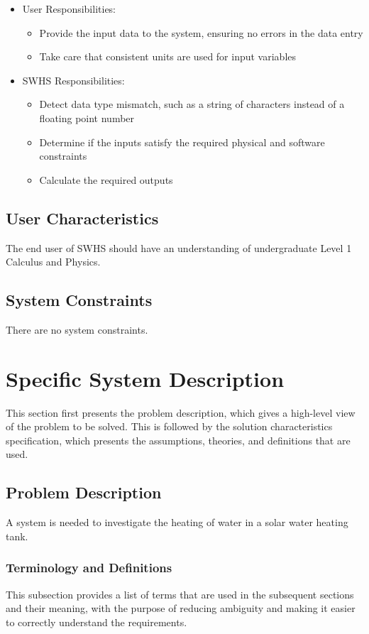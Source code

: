 \documentclass[12pt]{article}
\begin{document}
\begin{itemize}
\item{User Responsibilities:}
\begin{itemize}
\item{Provide the input data to the system, ensuring no errors in the data entry}
\item{Take care that consistent units are used for input variables}
\end{itemize}
\item{SWHS Responsibilities:}
\begin{itemize}
\item{Detect data type mismatch, such as a string of characters instead of a floating point number}
\item{Determine if the inputs satisfy the required physical and software constraints}
\item{Calculate the required outputs}
\end{itemize}
\end{itemize}
\subsection{User Characteristics}
\label{Sec:UserChars}
The end user of SWHS should have an understanding of undergraduate Level 1 Calculus and Physics.

\subsection{System Constraints}
\label{Sec:SysConstraints}
There are no system constraints.

\section{Specific System Description}
\label{Sec:SpecSystDesc}
This section first presents the problem description, which gives a high-level view of the problem to be solved. This is followed by the solution characteristics specification, which presents the assumptions, theories, and definitions that are used.

\subsection{Problem Description}
\label{Sec:ProbDesc}
A system is needed to investigate the heating of water in a solar water heating tank.

\subsubsection{Terminology and Definitions}
\label{Sec:TermDefs}
This subsection provides a list of terms that are used in the subsequent sections and their meaning, with the purpose of reducing ambiguity and making it easier to correctly understand the requirements.
\end{document}
